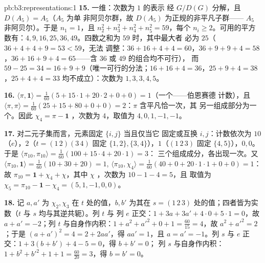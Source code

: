 \begin{solution}{pb:b3:representations:1}
\textbf{15.} 一维：次数为 $1$ 的表示
经 $G/D(G)$ 分解，且 $D(A_5) = A_5$（$A_5$ 为单
非阿贝尔群，故 $D(A_5)$ 为正规的非平凡子群——
$A_5$ 非阿贝尔）。于是 $n_1 = 1$，且 $n_2^2 + n_3^2 + n_4^2
+ n_5^2 = 59$，每个 $n_i \geq 2$。可用的平方数有：$4, 9,
16, 25, 36, 49$。四数之和为 $59$ 时，其中最大者
必为 $25$（$36 + 4 + 4 + 9 = 53 < 59$，无法
调整：$36 + 16 + 4 + 4 = 60$，$36 + 9 + 9 + 4 = 58$，$36 +
16 + 9 + 4 = 65$——含 $36$ 或 $49$ 的组合均不可行），
而 $59 - 25 = 34 = 16 + 9 + 9$（唯一可行的分法；$16 + 16 + 4 =
36$，$25 + 9 + 4 = 38$，$25 + 4 + 4 = 33$ 均不成立）：次数为 $1, 3, 3,
4, 5$。

\textbf{16.} $\langle\pi, \mathbf 1\rangle = \frac1{60}(5 +
15\cdot1 + 20\cdot2 + 0 + 0) = 1$（一个——伯恩赛德
计数），且 $\langle\pi, \pi\rangle = \frac1{60}(25 + 15 + 80 +
0 + 0) = 2$：$\pi$ 含平凡恰一次，其
另一组成部分为一个。因此 $\chi_4 = \pi
- \mathbf 1$ ，次数为 $4$，取值为 $4, 0,
1, -1, -1$。

\textbf{17.} 对二元子集而言，元素固定 $\{i,j\}$ 当且仅当它
固定或互换 $i, j$：计数依次为 $10$（$e$），$2$（$t =
(1\,2)(3\,4)$ 固定 $\{1,2\}, \{3,4\}$），$1$（$(1\,2\,3)$
固定 $\{4,5\}$），$0, 0$。于是 $\langle\pi_{10},
\pi_{10}\rangle = \frac1{60}(100 + 15\cdot4 + 20\cdot1) = 3$：
三个组成成分，各出现一次。又
$\langle\pi_{10}, \mathbf 1\rangle = \frac1{60}(10 + 30 + 20)
= 1$, $\langle\pi_{10}, \chi_4\rangle = \frac1{60}(40 + 0 +
20\cdot1\cdot1 + 0 + 0) = 1$：故 $\pi_{10} = \mathbf 1 + \chi_4
+ \chi$，其中 $\chi$ ，次数为 $10 - 1 - 4 = 5$，且
取值为 $\chi_5 = \pi_{10} - \mathbf 1 - \chi_4 = (5, 1, -1, 0,
0)$。

\textbf{18.} 记 $a, a'$ 为 $\chi_2, \chi_3$ 在
$t$ 处的值，$b, b'$ 为其在 $s = (1\,2\,3)$ 处的值；四者皆为实数（$t$
与 $s$ 均与其逆共轭）。列 $t$ 与
列 $e$ 正交：$1 + 3a + 3a' + 4\cdot0 + 5\cdot1 = 0$，故 $a + a'
= -2$；列 $t$ 与自身作内积：$1 + a^2 + a'^2 + 0 + 1 =
\frac{60}{15} = 4$，故 $a^2 + a'^2 = 2$；于是 $(a + a')^2 = 4
= 2 + 2aa'$，得 $aa' = 1$，且 $a = a' = -1$。列 $s$
与 $e$ 正交：$1 + 3(b + b') + 4 - 5 = 0$，得 $b + b' = 0$；
列 $s$ 与自身作内积：$1 + b^2 + b'^2 + 1 + 1 = \frac{60}
{20} = 3$，得 $b = b' = 0$。


\end{solution}
